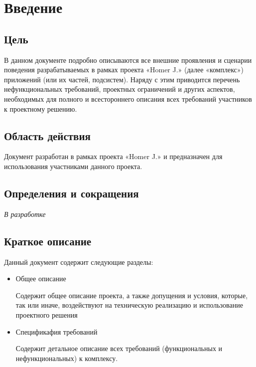 \section{Введение}

\subsection{Цель}
В данном документе подробно описываются все внешние проявления и сценарии поведения разрабатываемых в рамках проекта «Homer J.» (далее «комплекс») приложений (или их частей, подсистем). Наряду с этим приводится перечень нефункциональных требований, проектных ограничений и других аспектов, необходимых для полного и всестороннего описания всех требований участников к проектному решению.

\subsection{Область действия}
Документ разработан в рамках проекта «Homer J.» и предназначен для использования участниками данного проекта.

\subsection{Определения и сокращения}
\textsl{В разработке}

\subsection{Краткое описание}
Данный документ содержит следующие разделы:

\begin{itemize}
\item Общее описание

Содержит общее описание проекта, а также допущения и условия, которые, так или иначе, воздействуют на техническую реализацию и использование проектного решения
\item Спецификафия требований

Содержит детальное описание всех требований (функциональных и нефункциональных) к комплексу.
\end{itemize}

